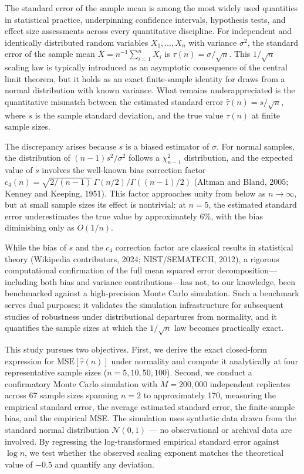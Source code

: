\documentclass[11pt]{article}
\begin{document}
The standard error of the sample mean is among the most widely used quantities in statistical practice, underpinning confidence intervals, hypothesis tests, and effect size assessments across every quantitative discipline. For independent and identically distributed random variables $X_1, \ldots, X_n$ with variance $\sigma^2$, the standard error of the sample mean $\bar{X} = n^{-1}\sum_{i=1}^n X_i$ is $\tau(n) = \sigma/\sqrt{n}$. This $1/\sqrt{n}$ scaling law is typically introduced as an asymptotic consequence of the central limit theorem, but it holds as an exact finite-sample identity for draws from a normal distribution with known variance. What remains underappreciated is the quantitative mismatch between the estimated standard error $\hat{\tau}(n) = s/\sqrt{n}$, where $s$ is the sample standard deviation, and the true value $\tau(n)$ at finite sample sizes.

The discrepancy arises because $s$ is a biased estimator of $\sigma$. For normal samples, the distribution of $(n-1)s^2/\sigma^2$ follows a $\chi^2_{n-1}$ distribution, and the expected value of $s$ involves the well-known bias correction factor $c_4(n) = \sqrt{2/(n-1)}\,\Gamma(n/2)/\Gamma((n-1)/2)$ (Altman and Bland, 2005; Kenney and Keeping, 1951). This factor approaches unity from below as $n \to \infty$, but at small sample sizes its effect is nontrivial: at $n=5$, the estimated standard error underestimates the true value by approximately 6\%, with the bias diminishing only as $O(1/n)$.

While the bias of $s$ and the $c_4$ correction factor are classical results in statistical theory (Wikipedia contributors, 2024; NIST/SEMATECH, 2012), a rigorous computational confirmation of the full mean squared error decomposition—including both bias and variance contributions—has not, to our knowledge, been benchmarked against a high-precision Monte Carlo simulation. Such a benchmark serves dual purposes: it validates the simulation infrastructure for subsequent studies of robustness under distributional departures from normality, and it quantifies the sample sizes at which the $1/\sqrt{n}$ law becomes practically exact.

This study pursues two objectives. First, we derive the exact closed-form expression for $\mathrm{MSE}[\hat{\tau}(n)]$ under normality and compute it analytically at four representative sample sizes ($n = 5, 10, 50, 100$). Second, we conduct a confirmatory Monte Carlo simulation with $M = 200{,}000$ independent replicates across 67 sample sizes spanning $n = 2$ to approximately 170, measuring the empirical standard error, the average estimated standard error, the finite-sample bias, and the empirical MSE. The simulation uses synthetic data drawn from the standard normal distribution $\mathcal{N}(0,1)$ — no observational or archival data are involved. By regressing the log-transformed empirical standard error against $\log n$, we test whether the observed scaling exponent matches the theoretical value of $-0.5$ and quantify any deviation.
\end{document}
